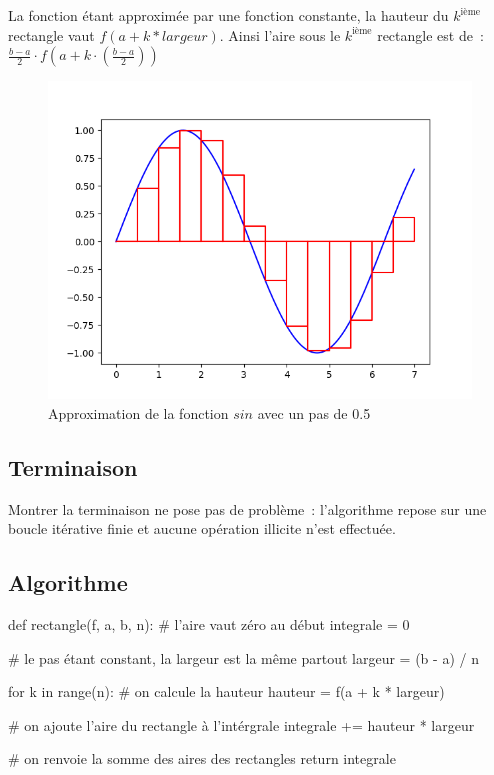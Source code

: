 		 La fonction étant approximée par une fonction constante, la hauteur du $k^{\textrm{ième}}$ rectangle vaut $f(a + k * largeur)$. Ainsi l'aire sous le $k^{\textrm{ième}}$ rectangle est de~: $\frac{b - a}{2} \cdot f \left( a + k \cdot \left( \frac{b - a}{2} \right) \right)$
		
		\begin{figure}[H]
			\centering
			\includegraphics[scale=0.75]{images/Figure_3.png}
			\caption{Approximation de la fonction $sin$ avec un pas de 0.5}
			\label{fig_3}
		\end{figure}
	
	\subsection{Terminaison}
		
		Montrer la terminaison ne pose pas de problème~: l'algorithme repose sur une boucle itérative finie et aucune opération illicite n'est effectuée.
	
	\subsection{Algorithme}
	
		\begin{pythoncode}
			def rectangle(f, a, b, n):
				# l'aire vaut zéro au début
				integrale = 0
				
				# le pas étant constant, la largeur est la même partout
				largeur = (b - a) / n
				
				for k in range(n):
					# on calcule la hauteur
					hauteur = f(a + k * largeur)
					
					# on ajoute l'aire du rectangle à l'intérgrale
					integrale += hauteur * largeur
				
				# on renvoie la somme des aires des rectangles
				return integrale	
		\end{pythoncode}
	

